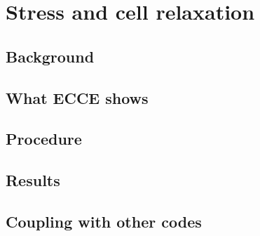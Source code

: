 \chapter{Stress and cell relaxation}
\label{ch:stress}


\section{Background}

\section{What ECCE shows}

\section{Procedure}

\section{Results}

\section{Coupling with other codes}

